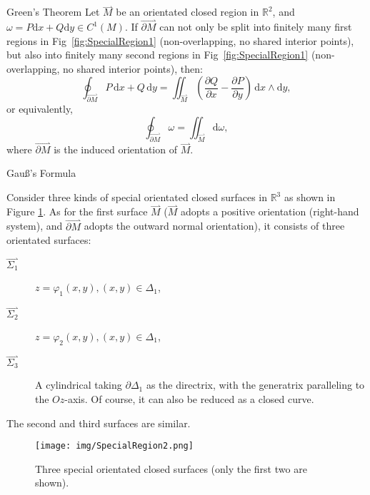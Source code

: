\documentclass[11pt]{../../TexTemplate/elegantbook}
\begin{document}
\begin{theorem}{Green's Theorem}
    Let \(\overset{\rightharpoonup}{M}\) be an orientated closed region in \(\mathbb{R}^{2}\),
    and \(\omega = P\mathrm{d}x + Q \mathrm{d}y \in C^{1}(M)\).
    If \(\overset{\rightharpoonup}{\partial M}\) can not only be split into finitely many first regions in Fig~\ref{fig:SpecialRegion1}
    (non-overlapping, no shared interior points),
    but also into finitely many second regions in Fig~\ref{fig:SpecialRegion1} (non-overlapping, no shared interior points),
    then:
    \[
    \oint_{\overset{\rightharpoonup}{\partial M}} P \, \mathrm{d}x + Q \, \mathrm{d}y = 
    \iint_{\overset{\rightharpoonup}{M}} \left( \frac{\partial Q}{\partial x} - 
    \frac{\partial P}{\partial y} \right) \, \mathrm{d}x \wedge \mathrm{d}y,
    \]
    or equivalently,
    \[
    \oint_{\overset{\rightharpoonup}{\partial M}} \omega = \iint_{\overset{\rightharpoonup}{M}} \mathrm{d}\omega,
    \]
    where \(\overset{\rightharpoonup}{\partial M}\) is the induced orientation of \(\overset{\rightharpoonup}{M}\).
\end{theorem}


\begin{leftbarTitle}{Gauß's Formula}\end{leftbarTitle}
Consider three kinds of special orientated closed surfaces in \(\mathbb{R}^{3}\) as shown in Figure \ref{fig:SpecialRegion2}.
As for the first surface \(\overset{\rightharpoonup}{M}\)
($\overset{\rightharpoonup}{M}$ adopts a positive orientation (right-hand system), 
and $\overset{\rightharpoonup}{\partial M}$ adopts the outward normal orientation), 
it consists of three orientated surfaces:
\begin{description}
    \item[\(\overset{\rightharpoonup}{\Sigma_1}\)] \(z = \varphi_{1}(x, y), (x, y) \in \Delta_{1}\),
    \item[\(\overset{\rightharpoonup}{\Sigma_2}\)] \(z = \varphi_{2}(x, y), (x, y) \in \Delta_{1}\),
    \item[\(\overset{\rightharpoonup}{\Sigma_3}\)] A cylindrical taking \(\partial \Delta_1\) as the directrix,
        with the generatrix paralleling to the \(Oz\)-axis. 
        Of course, it can also be reduced as a closed curve.
\end{description}
The second and third surfaces are similar.
\begin{figure}[h]
    \centering
    \texttt{[image: img/SpecialRegion2.png]}
    \caption{Three special orientated closed surfaces (only the first two are shown).}
    \label{fig:SpecialRegion2}
\end{figure}
\end{document}
